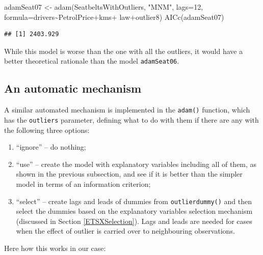 \documentclass[
]{book}
\newenvironment{Shaded}{\begin{snugshade}}{\end{snugshade}}
\newcommand{\AttributeTok}[1]{\textcolor[rgb]{0.77,0.63,0.00}{#1}}
\newcommand{\DecValTok}[1]{\textcolor[rgb]{0.00,0.00,0.81}{#1}}
\newcommand{\FunctionTok}[1]{\textcolor[rgb]{0.00,0.00,0.00}{#1}}
\newcommand{\NormalTok}[1]{#1}
\newcommand{\OtherTok}[1]{\textcolor[rgb]{0.56,0.35,0.01}{#1}}
\newcommand{\SpecialCharTok}[1]{\textcolor[rgb]{0.00,0.00,0.00}{#1}}
\newcommand{\StringTok}[1]{\textcolor[rgb]{0.31,0.60,0.02}{#1}}
\providecommand{\tightlist}{%
  \setlength{\itemsep}{0pt}\setlength{\parskip}{0pt}}
\theoremstyle{definition}
\theoremstyle{definition}
\theoremstyle{definition}
\theoremstyle{definition}
\theoremstyle{remark}
\begin{document}
\begin{Shaded}
\begin{Highlighting}[]
\NormalTok{adamSeat07 }\OtherTok{\textless{}{-}} \FunctionTok{adam}\NormalTok{(SeatbeltsWithOutliers, }\StringTok{"MNM"}\NormalTok{, }\AttributeTok{lags=}\DecValTok{12}\NormalTok{,}
                   \AttributeTok{formula=}\NormalTok{drivers}\SpecialCharTok{\textasciitilde{}}\NormalTok{PetrolPrice}\SpecialCharTok{+}\NormalTok{kms}\SpecialCharTok{+}
\NormalTok{                     law}\SpecialCharTok{+}\NormalTok{outlier8)}
\FunctionTok{AICc}\NormalTok{(adamSeat07)}
\end{Highlighting}
\end{Shaded}

\begin{verbatim}
## [1] 2403.929
\end{verbatim}

While this model is worse than the one with all the outliers, it would have a better theoretical rationale than the model \texttt{adamSeat06}.

\hypertarget{an-automatic-mechanism}{%
\subsection{An automatic mechanism}\label{an-automatic-mechanism}}

A similar automated mechanism is implemented in the \texttt{adam()} function, which has the \texttt{outliers} parameter, defining what to do with them if there are any with the following three options:

\begin{enumerate}
\def\labelenumi{\arabic{enumi}.}
\tightlist
\item
  ``ignore'' -- do nothing;
\item
  ``use'' -- create the model with explanatory variables including all of them, as shown in the previous subsection, and see if it is better than the simpler model in terms of an information criterion;
\item
  ``select'' -- create lags and leads of dummies from \texttt{outlierdummy()} and then select the dummies based on the explanatory variables selection mechanism (discussed in Section \ref{ETSXSelection}). Lags and leads are needed for cases when the effect of outlier is carried over to neighbouring observations.
\end{enumerate}

Here how this works in our case:
\end{document}
